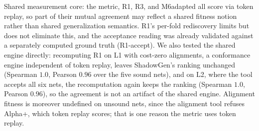 \documentclass[runningheads]{llncs}
\newcommand{\chg}[1]{#1}
\begin{document}
Shared measurement core: the metric, R1, R3, and M6adapted all score via token replay, so part of their mutual agreement may reflect a shared fitness notion rather than shared generalization semantics. R1's per-fold rediscovery limits but does not eliminate this, and the acceptance reading was already validated against a separately computed ground truth (R1-accept). \chg{We also tested the shared engine directly: recomputing R1 on L1 with cost-zero alignments, a conformance engine independent of token replay, leaves ShadowGen's ranking unchanged (Spearman $1.0$, Pearson $0.96$ over the five sound nets), and on L2, where the tool accepts all six nets, the recomputation again keeps the ranking (Spearman $1.0$, Pearson $0.96$), so the agreement is not an artifact of the shared engine. Alignment fitness is moreover undefined on unsound nets, since the alignment tool refuses Alpha+, which token replay scores; that is one reason the metric uses token replay.}
\end{document}
